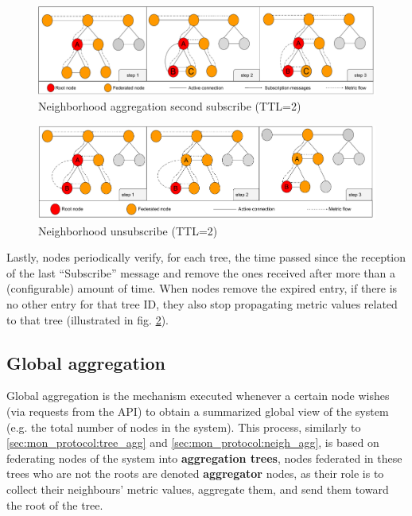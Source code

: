 \begin{figure}[htbp]
    \centering
    \includegraphics[width=\textwidth]{Chapters/aggregation/images/2nd_subscribe.pdf}
    \caption{Neighborhood aggregation second subscribe (TTL=2)}
    \label{sec:mon_protocol:img:neigh_agg_second_sub}
\end{figure}


\begin{figure}[htbp]
    \centering
    \includegraphics[width=\textwidth]{Chapters/aggregation/images/unsubscribe_process.pdf}
    \caption{Neighborhood unsubscribe (TTL=2)}
    \label{sec:mon_protocol:img:neigh_agg_unsub}
\end{figure}
    
Lastly, nodes periodically verify, for each tree, the time passed since the reception of the last ``Subscribe'' message and remove the ones received after more than a (configurable) amount of time. When nodes remove the expired entry, if there is no other entry for that tree ID, they also stop propagating metric values related to that tree (illustrated in fig. \ref{sec:mon_protocol:img:neigh_agg_unsub}).


\subsection{Global aggregation} \label{sec:mon_protocol:global_agg}

Global aggregation is the mechanism executed whenever a certain node wishes (via requests from the API) to obtain a summarized global view of the system (e.g. the total number of nodes in the system). This process, similarly to \ref{sec:mon_protocol:tree_agg} and \ref{sec:mon_protocol:neigh_agg}, is based on federating nodes of the system into \textbf{aggregation trees}, nodes federated in these trees who are not the roots are denoted \textbf{aggregator} nodes, as their role is to collect their neighbours' metric values, aggregate them, and send them toward the root of the tree.

